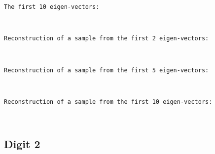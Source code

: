 \documentclass[11pt]{article}
\begin{document}
    \begin{Verbatim}[commandchars=\\\{\}]
The first 10 eigen-vectors:
    \end{Verbatim}

    \begin{center}
    \end{center}
    { \hspace*{\fill} \\}
    
    \begin{Verbatim}[commandchars=\\\{\}]
Reconstruction of a sample from the first 2 eigen-vectors:
    \end{Verbatim}

    \begin{center}
    \end{center}
    { \hspace*{\fill} \\}
    
    \begin{Verbatim}[commandchars=\\\{\}]
Reconstruction of a sample from the first 5 eigen-vectors:
    \end{Verbatim}

    \begin{center}
    \end{center}
    { \hspace*{\fill} \\}
    
    \begin{Verbatim}[commandchars=\\\{\}]
Reconstruction of a sample from the first 10 eigen-vectors:
    \end{Verbatim}

    \begin{center}
    \end{center}
    { \hspace*{\fill} \\}
    \pagebreak
    
    \hypertarget{digit-2}{%
\subsection{Digit 2}\label{digit-2}}
\end{document}
